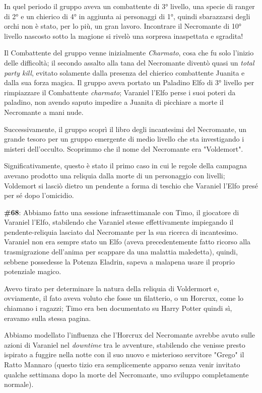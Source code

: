In quel periodo il gruppo aveva un combattente di 3° livello, una specie di ranger di 2° e un chierico di 4° in aggiunta ai personaggi di 1°, quindi sbarazzarsi degli orchi non è stato, per lo più, un gran lavoro. Incontrare il Necromante di 10° livello nascosto sotto la magione si rivelò una sorpresa inaspettata e sgradita!

Il Combattente del gruppo venne inizialmente \textit{Charmato}, cosa che fu solo l'inizio delle difficoltà; il secondo assalto alla tana del Necromante diventò quasi un \textit{total party kill}, evitato solamente dalla presenza del chierico combattente Juanita e dalla sua forza magica. Il gruppo aveva portato un Paladino Elfo di 3° livello per rimpiazzare il Combattente \textit{charmato}; Varaniel l'Elfo perse i suoi poteri da paladino, non avendo saputo impedire a Juanita di picchiare a morte il Necromante a mani nude.

Successivamente, il gruppo scoprì il libro degli incantesimi del Necromante, un grande tesoro per un gruppo emergente di medio livello che sta investigando i misteri dell'occulto. Scoprimmo che il nome del Necromante era "Voldemort".

Significativamente, questo è stato il primo caso in cui le regole della campagna avevano prodotto una reliquia dalla morte di un personaggio con livelli; Voldemort si lasciò dietro un pendente a forma di teschio che Varaniel l'Elfo presé per sé dopo l'omicidio.

\textbf{\#68}: Abbiamo fatto una sessione infrasettimanale con Timo, il giocatore di Varaniel l'Elfo, stabilendo che Varaniel stesse effettivamente impiegando il pendente-reliquia lasciato dal Necromante per la sua ricerca di incantesimo. Varaniel non era sempre stato un Elfo (aveva precedentemente fatto ricorso alla trasmigrazione dell'anima per scappare da una malattia maledetta), quindi, sebbene possedesse la Potenza Eladrin, sapeva a malapena usare il proprio potenziale magico.

Avevo tirato per determinare la natura della reliquia di Voldermort e, ovviamente, il fato aveva voluto che fosse un filatterio, o un Horcrux, come lo chiamano i ragazzi; Timo era ben documentato su Harry Potter quindi sì, eravamo sulla stessa pagina.

Abbiamo modellato l'influenza che l'Horcrux del Necromante avrebbe avuto sulle azioni di Varaniel nel \textit{downtime} tra le avventure, stabilendo che venisse presto ispirato a fuggire nella notte con il suo nuovo e misterioso servitore "Grego" il Ratto Mannaro (questo tizio era semplicemente apparso senza venir invitato qualche settimana dopo la morte del Necromante, uno sviluppo completamente normale).

